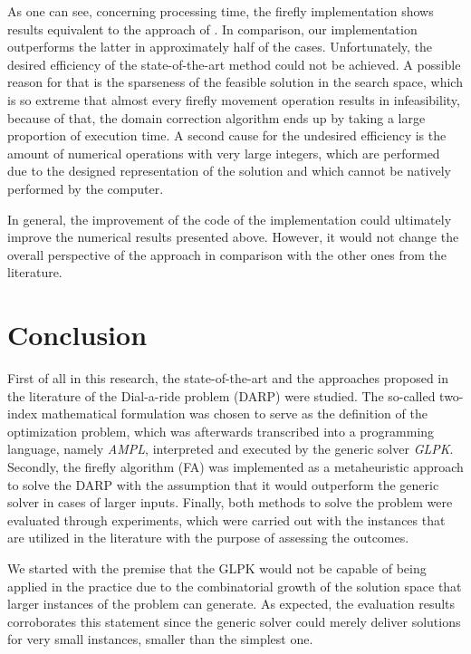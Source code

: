 \documentclass[tuberlin,cic,tc,openright,english,noabntcite,oneside]{iiufrgs}
\begin{document}
As one can see, concerning processing time, the firefly implementation shows results equivalent to the approach of  \textcite{parragh_introducing_2011}. In comparison, our implementation outperforms the latter in approximately half of the cases. Unfortunately, the desired efficiency of the state-of-the-art method could not be achieved. A possible reason for that is the sparseness of the feasible solution in the search space, which is so extreme that almost every firefly movement operation results in infeasibility, because of that, the domain correction algorithm ends up by taking a large proportion of execution time. A second cause for the undesired efficiency is the amount  of numerical operations with very large integers, which are performed due to the designed representation of the solution and which cannot be natively performed by the computer.

In general, the improvement of the code of the implementation could ultimately improve the numerical results presented above. However, it would not change the overall perspective of the approach in comparison with the other ones from the literature.

\chapter{Conclusion}
First of all in this research, the state-of-the-art and the approaches proposed in the literature of the Dial-a-ride problem (DARP) were studied. The so-called two-index mathematical formulation was chosen to serve as the definition of the optimization problem, which was afterwards transcribed into a programming language, namely \emph{AMPL}, interpreted and executed by the generic solver \emph{GLPK}. Secondly, the firefly algorithm (FA) was implemented as a metaheuristic approach to solve the DARP with the assumption that it would outperform the generic solver in cases of larger inputs. Finally, both methods to solve the problem were evaluated through experiments, which were carried out with the instances that are utilized in the literature with the purpose of assessing the outcomes.

We started with the premise that the GLPK would not be capable of being applied in the practice due to the combinatorial growth of the solution space that larger instances of the problem can generate. As expected, the evaluation results corroborates this statement since the generic solver could merely deliver solutions for very small instances, smaller than the simplest one.
\end{document}
